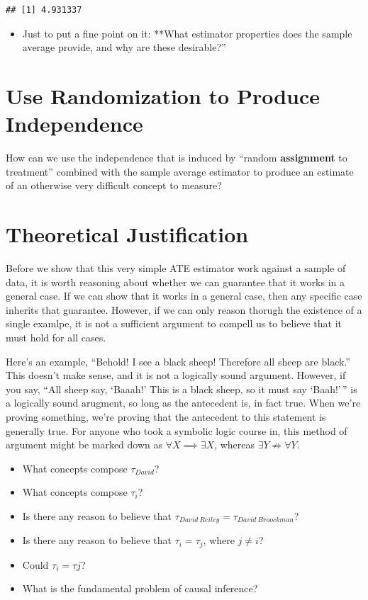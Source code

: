 \documentclass[
]{book}
\providecommand{\tightlist}{%
  \setlength{\itemsep}{0pt}\setlength{\parskip}{0pt}}
\begin{document}
\begin{verbatim}
## [1] 4.931337
\end{verbatim}

\begin{itemize}
\tightlist
\item
  Just to put a fine point on it: **What estimator properties does the
  sample average provide, and why are these desirable?''
\end{itemize}

\hypertarget{use-randomization-to-produce-independence}{%
\section{Use Randomization to Produce
Independence}\label{use-randomization-to-produce-independence}}

How can we use the independence that is induced by ``random
\textbf{assignment} to treatment'' combined with the sample average
estimator to produce an estimate of an otherwise very difficult concept
to measure?

\hypertarget{theoretical-justification}{%
\section{Theoretical Justification}\label{theoretical-justification}}

Before we show that this very simple ATE estimator work against a sample
of data, it is worth reasoning about whether we can guarantee that it
works in a general case. If we can show that it works in a general case,
then any specific case inherits that guarantee. However, if we can only
reason thorugh the existence of a single examlpe, it is not a sufficient
argument to compell us to believe that it must hold for all cases.

Here's an example, ``Behold! I see a black sheep! Therefore all sheep
are black.'' This doesn't make sense, and it is not a logically sound
argument. However, if you say, ``All sheep say, `Baaah!' This is a black
sheep, so it must say `Baah!'\,'' is a logically sound arugment, so long
as the antecedent is, in fact true. When we're proving something, we're
proving that the antecedent to this statement is generally true. For
anyone who took a symbolic logic course in, this method of argument
might be marked down as \(\forall X \implies \exists X\), whereas
\(\exists Y \not\Rightarrow \forall Y\).

\begin{itemize}
\tightlist
\item
  What concepts compose \(\tau_{David}\)?
\item
  What concepts compose \(\tau_{i}\)?
\item
  Is there any reason to believe that
  \(\tau_{David\ Reiley} = \tau_{David\ Broockman}\)?
\item
  Is there any reason to believe that \(\tau_{i} = \tau_{j}\), where
  \(j \neq i\)?
\item
  Could \(\tau_{i} = \tau{j}\)?
\item
  What is the fundamental problem of causal inference?
\end{itemize}
\end{document}
